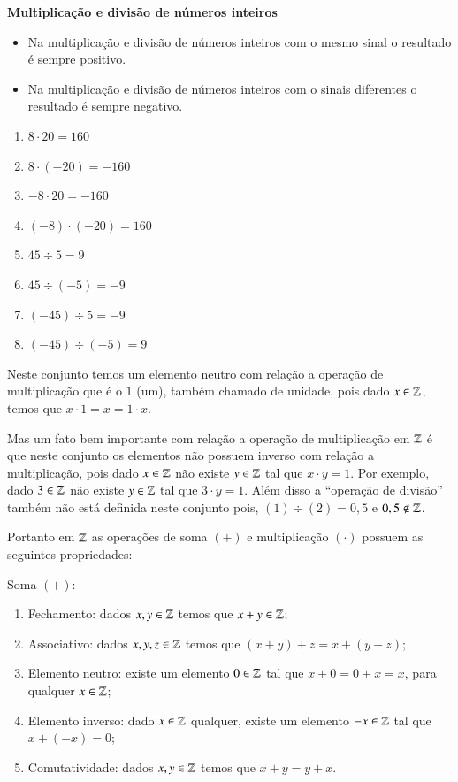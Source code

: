  \textbf{Multiplicação e divisão de números inteiros}

  \begin{itemize}
   \item Na multiplicação e divisão de números inteiros com o mesmo sinal o resultado é sempre positivo.
   \item Na multiplicação e divisão de números inteiros com o sinais diferentes o resultado é sempre negativo.
  \end{itemize}

  \begin{multicols}{2}
  \begin{enumerate}[1)]
   \item $8 \cdot 20= 160$
   \item $8 \cdot (-20)= -160$
   \item $-8 \cdot 20= -160$
   \item $(-8) \cdot (-20)= 160$
   \item $45 \div 5= 9$
   \item $45 \div (-5)= -9$
   \item $(-45) \div 5= -9$
   \item $(-45) \div (-5)= 9$
  \end{enumerate}
  \end{multicols}

 Neste conjunto temos um elemento neutro com relação a operação de multiplicação que é o $1$ (um), também chamado de unidade, pois dado $x \in \mathbb{Z}$, temos que $x \cdot 1= x= 1 \cdot x$.

 Mas um fato bem importante com relação a operação de multiplicação em $\mathbb{Z}$ é que neste conjunto os elementos não possuem inverso com relação a multiplicação, pois dado $x \in \mathbb{Z}$ não existe $y \in \mathbb{Z}$ tal que $x \cdot y= 1$. Por exemplo, dado $3 \in \mathbb{Z}$ não existe $y \in \mathbb{Z}$ tal que $3 \cdot y= 1$. Além disso a ``operação de divisão'' também não está definida neste conjunto pois, $(1)\div (2)= 0,5$ e $0,5 \notin \mathbb{Z}$.
 
   \vskip0.3cm
 
 Portanto em $\mathbb{Z}$ as operações de soma $(+)$ e multiplicação $(\cdot)$ possuem as seguintes propriedades:
 
 Soma $(+)$:
 \begin{enumerate}[1)]
 \item Fechamento: dados $x, y \in \mathbb{Z}$ temos que $x+y \in \mathbb{Z}$;
 \item Associativo: dados $x, y, z \in \mathbb{Z}$ temos que $(x+y)+z= x+(y+z)$;
 \item Elemento neutro: existe um elemento $0 \in \mathbb{Z}$ tal que $x+0=0+x=x$, para qualquer $x \in \mathbb{Z}$;
 \item Elemento inverso: dado $x \in \mathbb{Z}$ qualquer, existe um elemento $-x \in \mathbb{Z}$ tal que $x+(-x)=0$;
 \item Comutatividade: dados $x, y \in \mathbb{Z}$ temos que $x+y= y+x$. 
 \end{enumerate}
 
